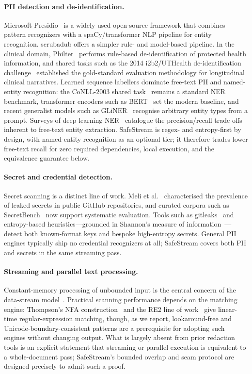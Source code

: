 \documentclass[runningheads]{llncs}
\begin{document}
\paragraph{PII detection and de-identification.}
Microsoft Presidio~\cite{presidio} is a widely used open-source framework that
combines pattern recognizers with a spaCy/transformer NLP pipeline for entity
recognition. scrubadub offers a simpler rule- and model-based pipeline. In the
clinical domain, Philter~\cite{philter} performs rule-based de-identification of
protected health information, and shared tasks such as the 2014 i2b2/UTHealth
de-identification challenge~\cite{n2c2} established the gold-standard evaluation
methodology for longitudinal clinical narratives. Learned sequence labellers
dominate free-text PII and named-entity recognition: the CoNLL-2003 shared
task~\cite{conll2003} remains a standard NER benchmark, transformer encoders
such as BERT~\cite{bert} set the modern baseline, and recent generalist models
such as GLiNER~\cite{gliner} recognise arbitrary entity types from a prompt.
Surveys of deep-learning NER~\cite{nersurvey} catalogue the precision/recall
trade-offs inherent to free-text entity extraction. SafeStream is regex- and
entropy-first by design, with named-entity recognition as an optional tier; it
therefore trades lower free-text recall for zero required dependencies, local
execution, and the equivalence guarantee below.

\paragraph{Secret and credential detection.}
Secret scanning is a distinct line of work. Meli et al.~\cite{howbadgit}
characterised the prevalence of leaked secrets in public GitHub repositories,
and curated corpora such as SecretBench~\cite{secretbench} now support
systematic evaluation. Tools such as gitleaks~\cite{gitleaks} and entropy-based
heuristics---grounded in Shannon's measure of information~\cite{shannon}---detect
both known-format keys and bespoke high-entropy secrets. General PII engines
typically ship no credential recognizers at all; SafeStream covers both PII and
secrets in the same streaming pass.

\paragraph{Streaming and parallel text processing.}
Constant-memory processing of unbounded input is the central concern of the
data-stream model~\cite{muthukrishnan}. Practical scanning performance depends on
the matching engine: Thompson's NFA construction~\cite{thompson} and the RE2
line of work~\cite{re2} give linear-time regular-expression matching, though, as
we report, lookaround-free and Unicode-boundary-consistent patterns are a
prerequisite for adopting such engines without changing output. What is largely
absent from prior redaction tools is an explicit statement that streaming or
parallel execution is equivalent to a whole-document pass; SafeStream's bounded
overlap and seam protocol are designed precisely to admit such a proof.
\end{document}
